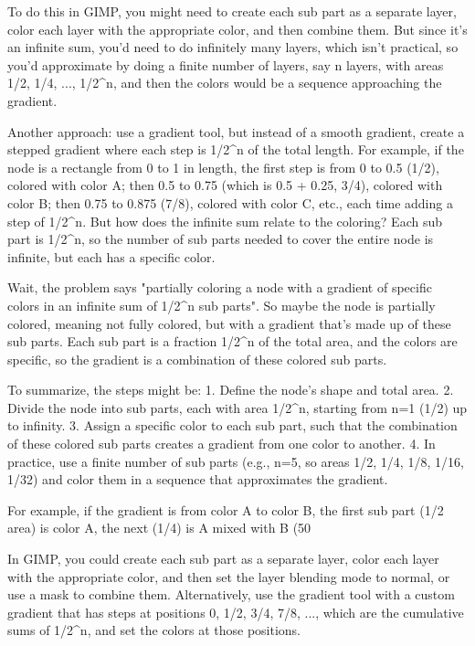 To do this in GIMP, you might need to create each sub part as a separate layer, color each layer with the appropriate color, and then combine them. But since it's an infinite sum, you'd need to do infinitely many layers, which isn't practical, so you'd approximate by doing a finite number of layers, say n layers, with areas 1/2, 1/4, ..., 1/2^n, and then the colors would be a sequence approaching the gradient. 

Another approach: use a gradient tool, but instead of a smooth gradient, create a stepped gradient where each step is 1/2^n of the total length. For example, if the node is a rectangle from 0 to 1 in length, the first step is from 0 to 0.5 (1/2), colored with color A; then 0.5 to 0.75 (which is 0.5 + 0.25, 3/4), colored with color B; then 0.75 to 0.875 (7/8), colored with color C, etc., each time adding a step of 1/2^n. But how does the infinite sum relate to the coloring? Each sub part is 1/2^n, so the number of sub parts needed to cover the entire node is infinite, but each has a specific color. 

Wait, the problem says "partially coloring a node with a gradient of specific colors in an infinite sum of 1/2^n sub parts". So maybe the node is partially colored, meaning not fully colored, but with a gradient that's made up of these sub parts. Each sub part is a fraction 1/2^n of the total area, and the colors are specific, so the gradient is a combination of these colored sub parts. 

To summarize, the steps might be: 1. Define the node's shape and total area. 2. Divide the node into sub parts, each with area 1/2^n, starting from n=1 (1/2) up to infinity. 3. Assign a specific color to each sub part, such that the combination of these colored sub parts creates a gradient from one color to another. 4. In practice, use a finite number of sub parts (e.g., n=5, so areas 1/2, 1/4, 1/8, 1/16, 1/32) and color them in a sequence that approximates the gradient. 

For example, if the gradient is from color A to color B, the first sub part (1/2 area) is color A, the next (1/4) is A mixed with B (50%

In GIMP, you could create each sub part as a separate layer, color each layer with the appropriate color, and then set the layer blending mode to normal, or use a mask to combine them. Alternatively, use the gradient tool with a custom gradient that has steps at positions 0, 1/2, 3/4, 7/8, ..., which are the cumulative sums of 1/2^n, and set the colors at those positions. 

